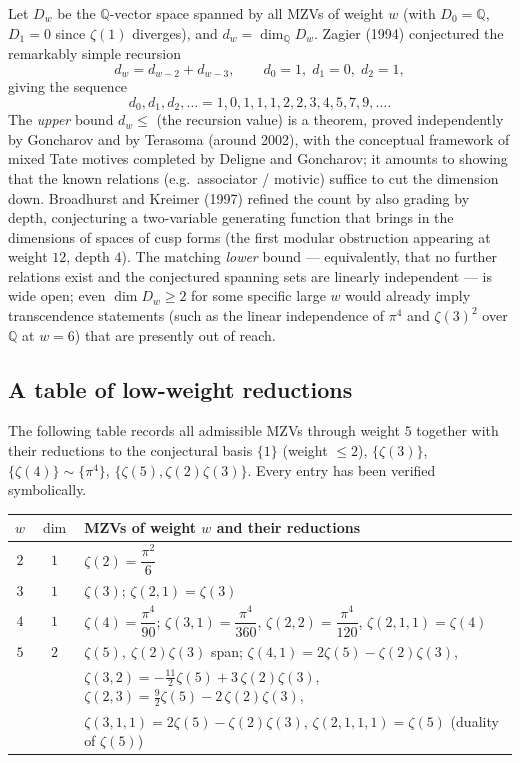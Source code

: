 \documentclass[11pt]{article}
\theoremstyle{plain}
\theoremstyle{remark}
\begin{document}
Let $D_w$ be the $\mathbb{Q}$-vector space spanned by all MZVs of weight $w$ (with $D_0=\mathbb{Q}$, $D_1=0$ since $\zeta(1)$ diverges), and $d_w=\dim_\mathbb{Q}D_w$. Zagier (1994) conjectured the remarkably simple recursion
\begin{equation}
  d_w=d_{w-2}+d_{w-3},\qquad d_0=1,\;d_1=0,\;d_2=1,
  \label{eq:zagier-dim}
\end{equation}
giving the sequence
\[
  d_0,d_1,d_2,\dots=1,0,1,1,1,2,2,3,4,5,7,9,\dots .
\]
The \emph{upper} bound $d_w\le$ (the recursion value) is a theorem, proved independently by Goncharov and by Terasoma (around 2002), with the conceptual framework of mixed Tate motives completed by Deligne and Goncharov; it amounts to showing that the known relations (e.g.\ associator / motivic) suffice to cut the dimension down. Broadhurst and Kreimer (1997) refined the count by also grading by depth, conjecturing a two-variable generating function that brings in the dimensions of spaces of cusp forms (the first modular obstruction appearing at weight $12$, depth $4$). The matching \emph{lower} bound --- equivalently, that no further relations exist and the conjectured spanning sets are linearly independent --- is wide open; even $\dim D_w\ge2$ for some specific large $w$ would already imply transcendence statements (such as the linear independence of $\pi^4$ and $\zeta(3)^2$ over $\mathbb{Q}$ at $w=6$) that are presently out of reach.

\subsection*{A table of low-weight reductions}

The following table records all admissible MZVs through weight $5$ together with their reductions to the conjectural basis $\{1\}$ (weight $\le2$), $\{\zeta(3)\}$, $\{\zeta(4)\}\sim\{\pi^4\}$, $\{\zeta(5),\zeta(2)\zeta(3)\}$. Every entry has been verified symbolically.

\begin{center}
\renewcommand{\arraystretch}{1.25}
\begin{tabular}{c c l}
\hline
$w$ & $\dim$ & MZVs of weight $w$ and their reductions\\
\hline
$2$ & $1$ & $\zeta(2)=\dfrac{\pi^2}{6}$\\
$3$ & $1$ & $\zeta(3)$; \quad $\zeta(2,1)=\zeta(3)$\\
$4$ & $1$ & $\zeta(4)=\dfrac{\pi^4}{90}$; \quad $\zeta(3,1)=\dfrac{\pi^4}{360}$, \quad $\zeta(2,2)=\dfrac{\pi^4}{120}$, \quad $\zeta(2,1,1)=\zeta(4)$\\
$5$ & $2$ & $\zeta(5),\ \zeta(2)\zeta(3)$ span; \quad $\zeta(4,1)=2\zeta(5)-\zeta(2)\zeta(3)$,\\
    &     & $\zeta(3,2)=-\tfrac{11}{2}\zeta(5)+3\,\zeta(2)\zeta(3)$, \quad $\zeta(2,3)=\tfrac{9}{2}\zeta(5)-2\,\zeta(2)\zeta(3)$,\\
    &     & $\zeta(3,1,1)=2\zeta(5)-\zeta(2)\zeta(3)$, \quad $\zeta(2,1,1,1)=\zeta(5)$ (duality of $\zeta(5)$)\\
\hline
\end{tabular}
\end{center}
\end{document}
